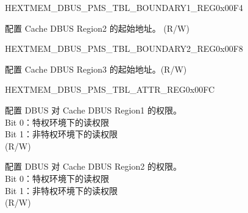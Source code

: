 \begin{register}{H}{EXTMEM\_DBUS\_PMS\_TBL\_BOUNDARY1\_REG}{0x00F4}\label{regdesc:EXTMEMDBUSPMSTBLBOUNDARY1REG}
%
%
\regnewline%
\begin{regdesc}\begin{reglist}
\label{fielddesc:EXTMEMDBUSPMSBOUNDARY1}\item [EXTMEM\_DBUS\_PMS\_BOUNDARY1] 配置 Cache DBUS Region2 的起始地址。 (R/W)
\end{reglist}\end{regdesc}
\end{register}


\begin{register}{H}{EXTMEM\_DBUS\_PMS\_TBL\_BOUNDARY2\_REG}{0x00F8}\label{regdesc:EXTMEMDBUSPMSTBLBOUNDARY2REG}
%
%
\regnewline%
\begin{regdesc}\begin{reglist}
\label{fielddesc:EXTMEMDBUSPMSBOUNDARY2}\item [EXTMEM\_DBUS\_PMS\_BOUNDARY2] 配置 Cache DBUS Region3 的起始地址。(R/W)
\end{reglist}\end{regdesc}
\end{register}


\begin{register}{H}{EXTMEM\_DBUS\_PMS\_TBL\_ATTR\_REG}{0x00FC}\label{regdesc:EXTMEMDBUSPMSTBLATTRREG}
%
%
%
\regnewline%
\begin{regdesc}\begin{reglist}
\label{fielddesc:EXTMEMDBUSPMSSCT1ATTR}\item [EXTMEM\_DBUS\_PMS\_SCT1\_ATTR] 
配置 DBUS 对 Cache DBUS Region1 的权限。\\
Bit 0：特权环境下的读权限\\
Bit 1：非特权环境下的读权限\\
(R/W)
\label{fielddesc:EXTMEMDBUSPMSSCT2ATTR}\item [EXTMEM\_DBUS\_PMS\_SCT2\_ATTR] 配置 DBUS 对 Cache DBUS Region2 的权限。\\
Bit 0：特权环境下的读权限\\
Bit 1：非特权环境下的读权限\\
(R/W)
\end{reglist}\end{regdesc}
\end{register}
